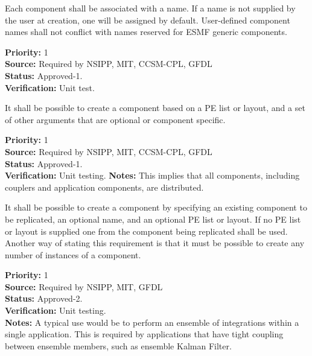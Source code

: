 
\label{req:compall}

Each component shall be associated with a name.  If a name is not
supplied by the user at creation, one will be assigned by default.  
User-defined component names shall not conflict with names reserved for ESMF 
generic components.     
\begin{reqlist}
{\bf Priority:} 1\\
{\bf Source:} Required by NSIPP, MIT, CCSM-CPL, GFDL \\
{\bf Status:} Approved-1. \\
{\bf Verification:} Unit test. 
\end{reqlist}


It shall be possible to create a component based on a PE list or 
layout, and a set of other arguments that are optional or component specific. 
\begin{reqlist}
{\bf Priority:} 1 \\
{\bf Source:} Required by NSIPP, MIT, CCSM-CPL, GFDL  \\
{\bf Status:} Approved-1. \\
{\bf Verification:} Unit testing.
{\bf Notes:} This implies that all components, including couplers and
application components, are distributed.
\end{reqlist}

It shall be possible to create a component by specifying an 
existing component to be replicated, an optional name, and an 
optional PE list or layout.  If no PE list or layout is supplied 
one from the component being replicated shall be used.  Another
way of stating this requirement is that it must be possible to 
create any number of instances of a component.
\begin{reqlist}
{\bf Priority:} 1\\
{\bf Source:} Required by NSIPP, MIT, GFDL \\
{\bf Status:} Approved-2.\\
{\bf Verification:} Unit testing.\\
{\bf Notes:} A typical use would be to perform an ensemble of 
integrations within a single application.  This is required by 
applications that have tight coupling between ensemble members, 
such as ensemble Kalman Filter.
\end{reqlist}

